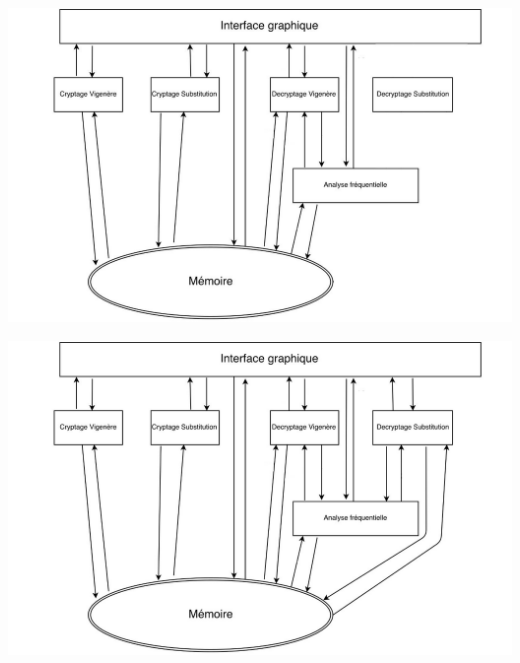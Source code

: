 \documentclass[10pt,xcolor=table]{beamer}
\begin{document}
\begin{frame}
\includegraphics[scale = 0.22]{Org6.jpg}
\end{frame}
\begin{frame}
\includegraphics[scale = 0.22]{Org7.jpg}
\end{frame}
\end{document}
